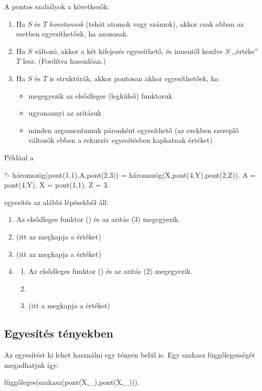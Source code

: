 A pontos szabályok a következők:
\begin{enumerate}
\item Ha $S$ és $T$ \emph{konstansok} (tehát
  atomok vagy számok), akkor csak abban az esetben
  egyesíthetőek, ha azonosak.
\item Ha $S$ változó, akkor a két kifejezés
  egyesíthető, és innentől kezdve $S$ ,,értéke''
  $T$ lesz. (Fordítva hasonlóan.)
\item Ha $S$ és $T$ is struktúrák, akkor pontosan akkor egyesíthetőek, ha
  \begin{itemize}
  \item megegyezik az elsődleges (legkülső) funktoruk
  \item ugyanannyi az aritásuk
  \item minden argumentumuk páronként egyesíthető
    (az ezekben szereplő változók ebben a rekurzív
    egyesítésben kaphatnak értéket)
  \end{itemize}
\end{enumerate}

Például a
\begin{query}
?- háromszög(pont(1,1),A,pont(2,3)) =
   háromszög(X,pont(4,Y),pont(2,Z)).
A = pont(4,Y),
X = pont(1,1),
Z = 3.
\end{query}
egyesítés az alábbi lépésekből áll:
\begin{enumerate}
\item Az elsődleges funktor () és az
  aritás (3) megegyezik.
\item {}
  (itt az  megkapja a  értéket)
\item {}
  (itt az  megkapja a  értéket)
\item {}
  \begin{enumerate}
    \item Az elsődleges funktor () és az
      aritás (2) megegyezik.
    \item {}
    \item {}
      (itt a  megkapja a  értéket)
  \end{enumerate}
\end{enumerate}

\subsection*{Egyesítés tényekben}
	
Az egyesítést ki lehet használni egy tényen belül
is. Egy szakasz függőlegességét megadhatjuk így:
\begin{program}
függőleges(szakasz(pont(X,_),pont(X,_))).
\end{program}

